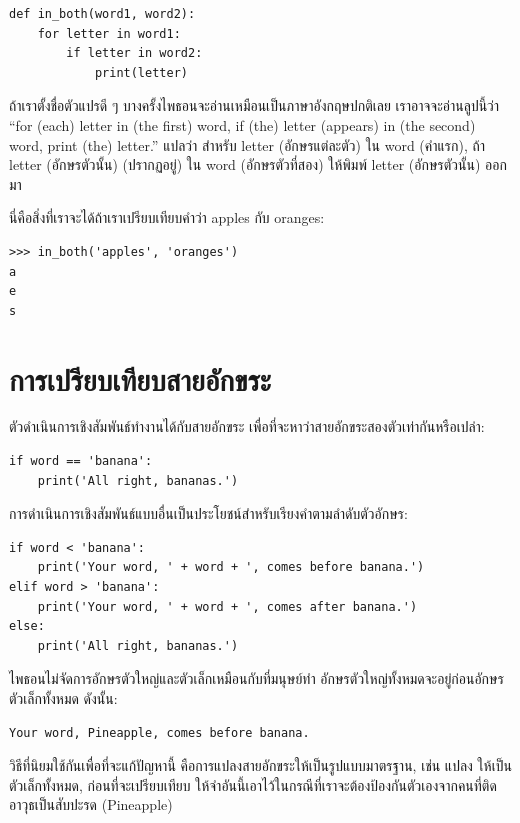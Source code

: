 \begin{verbatim}
def in_both(word1, word2):
    for letter in word1:
        if letter in word2:
            print(letter)
\end{verbatim}
%
ถ้าเราตั้งชื่อตัวแปรดี ๆ บางครั้งไพธอนจะอ่านเหมือนเป็นภาษาอังกฤษปกติเลย 
เราอาจจะอ่านลูปนี้ว่า ``for (each) letter in (the first) word, if (the) letter 
(appears) in (the second) word, print (the) letter.'' แปลว่า สำหรับ
letter (อักษรแต่ละตัว) ใน word (คำแรก), ถ้า letter (อักษรตัวนั้น) (ปรากฏอยู่) ใน word 
(อักษรตัวที่สอง) ให้พิมพ์ letter (อักษรตัวนั้น) ออกมา

นี่คือสิ่งที่เราจะได้ถ้าเราเปรียบเทียบคำว่า apples กับ oranges:

\begin{verbatim}
>>> in_both('apples', 'oranges')
a
e
s
\end{verbatim}
%

\section{การเปรียบเทียบสายอักขระ} %

ตัวดำเนินการเชิงสัมพันธ์ทำงานได้กับสายอักขระ เพื่อที่จะหาว่าสายอักขระสองตัวเท่ากันหรือเปล่า:

\begin{verbatim}
if word == 'banana':
    print('All right, bananas.')
\end{verbatim}
%
การดำเนินการเชิงสัมพันธ์แบบอื่นเป็นประโยชน์สำหรับเรียงคำตามลำดับตัวอักษร:

\begin{verbatim}
if word < 'banana':
    print('Your word, ' + word + ', comes before banana.')
elif word > 'banana':
    print('Your word, ' + word + ', comes after banana.')
else:
    print('All right, bananas.')
\end{verbatim}
%
ไพธอนไม่จัดการอักษรตัวใหญ่และตัวเล็กเหมือนกับที่มนุษย์ทำ 
อักษรตัวใหญ่ทั้งหมดจะอยู่ก่อนอักษรตัวเล็กทั้งหมด ดังนั้น:

\begin{verbatim}
Your word, Pineapple, comes before banana.
\end{verbatim}
%
วิธีที่นิยมใช้กันเพื่อที่จะแก้ปัญหานี้ คือการแปลงสายอักขระให้เป็นรูปแบบมาตรฐาน, เช่น แปลง
ให้เป็นตัวเล็กทั้งหมด, ก่อนที่จะเปรียบเทียบ ให้จำอันนี้เอาไว้ในกรณีที่เราจะต้องป้องกันตัวเองจากคนที่ติดอาวุธเป็นสับปะรด (Pineapple)


